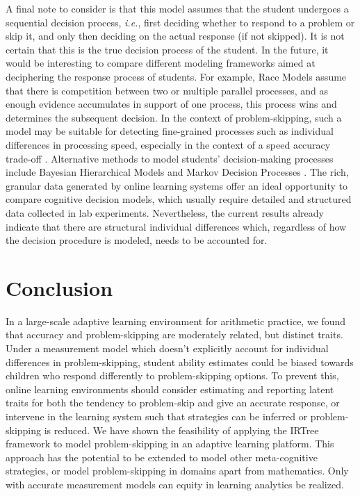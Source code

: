 \documentclass{edm_article}
\begin{document}
A final note to consider is that this model assumes that the student undergoes a sequential decision process, \textit{i.e.}, first deciding whether to respond to a problem or skip it, and only then deciding on the actual response (if not skipped). It is not certain that this is the true decision process of the student. In the future, it would be interesting to compare different modeling frameworks aimed at deciphering the response process of students. For example, Race Models \cite{heathcote2022winner} assume that there is competition between two or multiple parallel processes, and as enough evidence accumulates in support of one process, this process wins and determines the subsequent decision. In the context of problem-skipping, such a model may be suitable for detecting fine-grained processes such as individual differences in processing speed, especially in the context of a speed accuracy trade-off \cite{heathcote2022winner, evans2018modeling}. Alternative methods to model students' decision-making processes include Bayesian Hierarchical Models \cite{sawyer2018modeling, lee2014bayesian} and Markov Decision Processes \cite{lamar2018markov, puterman1994markov}. The rich, granular data generated by online learning systems offer an ideal opportunity to compare cognitive decision models, which usually require detailed and structured data collected in lab experiments. Nevertheless, the current results already indicate that there are structural individual differences which, regardless of how the decision procedure is modeled, needs to be accounted for.

\section{Conclusion}
In a large-scale adaptive learning environment for arithmetic practice, we found that accuracy and problem-skipping are moderately related, but distinct traits. Under a measurement model which doesn't explicitly account for individual differences in problem-skipping, student ability estimates could be biased towards children who respond differently to problem-skipping options. To prevent this, online learning environments should consider estimating and reporting latent traits for both the tendency to problem-skip and give an accurate response, or intervene in the learning system such that strategies can be inferred or problem-skipping is reduced. We have shown the feasibility of applying the IRTree framework \cite{de2012irtrees} to model problem-skipping in an adaptive learning platform. This approach has the potential to be extended to model other meta-cognitive strategies, or model problem-skipping in domains apart from mathematics. Only with accurate measurement models can equity in learning analytics be realized. 
\end{document}

